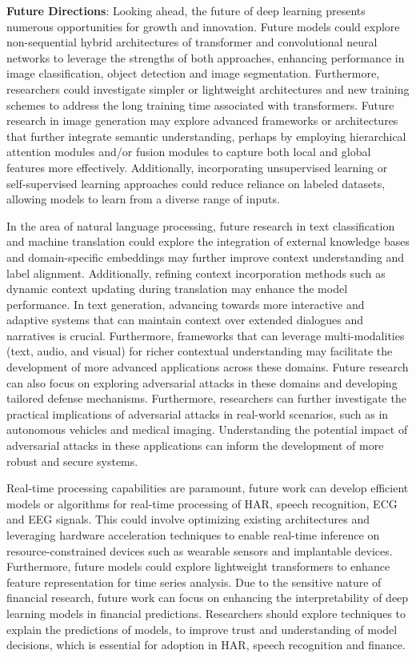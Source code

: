 \documentclass[preprint,12pt]{elsarticle}
\begin{document}
\textbf{Future Directions}: Looking ahead, the future of deep learning presents numerous opportunities for growth and innovation. Future models could explore non-sequential hybrid architectures of transformer and convolutional neural networks to leverage the strengths of both approaches, enhancing performance in image classification, object detection and image segmentation. Furthermore, researchers could investigate simpler or lightweight architectures and new training schemes to address the long training time associated with transformers. Future research in image generation may explore advanced frameworks or architectures that further integrate semantic understanding, perhaps by employing hierarchical attention modules and/or fusion modules to capture both local and global features more effectively. Additionally, incorporating unsupervised learning or self-supervised learning approaches could reduce reliance on labeled datasets, allowing models to learn from a diverse range of inputs. 

In the area of natural language processing, future research in text classification and machine translation could explore the integration of external knowledge bases and domain-specific embeddings may further improve context understanding and label alignment. Additionally, refining context incorporation methods such as dynamic context updating during translation may enhance the model performance. In text generation, advancing towards more interactive and adaptive systems that can maintain context over extended dialogues and narratives is crucial. Furthermore, frameworks that can leverage multi-modalities (text, audio, and visual) for richer contextual understanding may facilitate the development of more advanced applications across these domains. Future research can also focus on exploring adversarial attacks in these domains and developing tailored defense mechanisms. Furthermore, researchers can further investigate the practical implications of adversarial attacks in real-world scenarios, such as in autonomous vehicles and medical imaging. Understanding the potential impact of adversarial attacks in these applications can inform the development of more robust and secure systems.

Real-time processing capabilities are paramount, future work can develop efficient models or algorithms for real-time processing of HAR, speech recognition, ECG and EEG signals. This could involve optimizing existing architectures and leveraging hardware acceleration techniques to enable real-time inference on resource-constrained devices such as wearable sensors and implantable devices. Furthermore, future models could explore lightweight transformers to enhance feature representation for time series analysis. Due to the sensitive nature of financial research, future work can focus on enhancing the interpretability of deep learning models in financial predictions. Researchers should explore techniques to explain the predictions of models, to improve trust and understanding of model decisions, which is essential for adoption in HAR, speech recognition and finance. 
\end{document}
